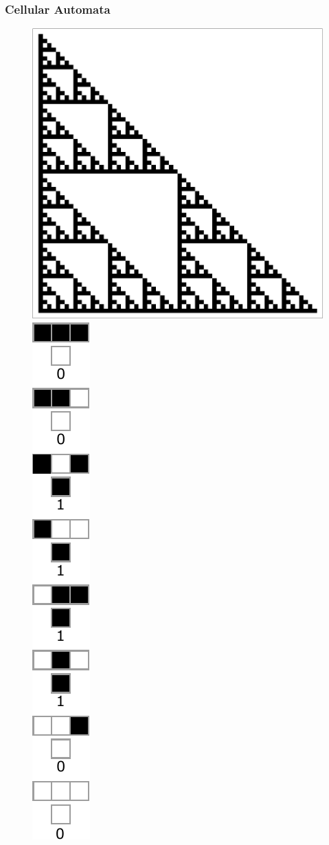 \documentclass{beamer}
\begin{document}
\begin{frame}
    \frametitle{Cellular Automata}
    \begin{figure}
        \includegraphics[scale=0.5]{seir.pdf}
        \includegraphics[scale=0.6]{rule60.pdf}

\end{figure}
\end{frame}
\end{document}
